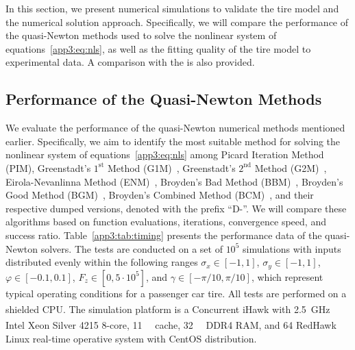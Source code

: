 In this section, we present numerical simulations to validate the tire model and the numerical solution approach. Specifically, we will compare the performance of the quasi-Newton methods used to solve the nonlinear system of equations~\eqref{app3:eq:nls}, as well as the fitting quality of the tire model to experimental data. A comparison with the \MagicFormulae{} is also provided.

\subsection{Performance of the Quasi-Newton Methods}

We evaluate the performance of the quasi-Newton numerical methods mentioned earlier. Specifically, we aim to identify the most suitable method for solving the nonlinear system of equations~\eqref{app3:eq:nls} among Picard Iteration Method (PIM), Greenstadt's $1^\text{st}$ Method (G1M)~\cite{spedicato1978some}, Greenstadt's $2^\text{nd}$ Method (G2M)~\cite{spedicato1978some}, Eirola-Nevanlinna Method (ENM)~\cite{eirola1989accelerating}, Broyden's Bad Method (BBM)~\cite{broyden1965class},
Broyden's Good Method (BGM)~\cite{broyden1965class}, Broyden's Combined Method (BCM)~\cite{martinez1982sobre},
%
%
and their respective dumped versions, denoted with the prefix ``D-''. We will compare these algorithms based on function evaluations, iterations, convergence speed, and success ratio. Table~\ref{app3:tab:timing} presents the performance data of the quasi-Newton solvers. The tests are conducted on a set of $10^5$ simulations with inputs distributed evenly within the following ranges $\sigma_x\in[-1,1]$, $\sigma_y\in[-1,1]$, $\varphi\in[-0.1,0.1]$, $F_z\in[0,5\cdot10^5]$, and $\gamma \in [-\pi/10, \pi/10]$, which represent typical operating conditions for a passenger car tire. All tests are performed on a shielded CPU. The simulation platform is a Concurrent\textsuperscript{\textregistered} iHawk\textsuperscript{\texttrademark} with \SI{2.5}{\giga\hertz} Intel\textsuperscript{\textregistered} Xeon\textsuperscript{\textregistered} Silver 4215 8-core, \SI{11}{\mega\byte} cache, \SI{32}{\giga\byte} DDR4 RAM, and \SI{64}{\bit} RedHawk\textsuperscript{\texttrademark} Linux real-time operative system with CentOS distribution.

